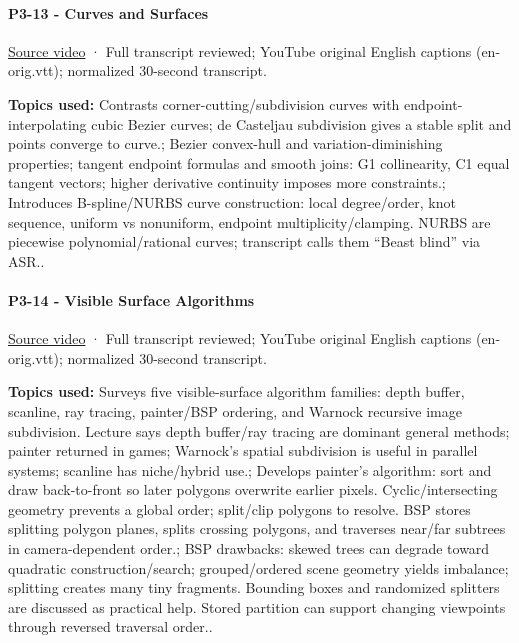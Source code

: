 \paragraph{P3-13 - Curves and Surfaces}\label{p3-13---curves-and-surfaces}

\href{https://www.youtube.com/watch?v=FTg1DUr7bhY}{Source video} · Full transcript reviewed; YouTube original English captions (en-orig.vtt); normalized 30-second transcript.

\textbf{Topics used:} Contrasts corner-cutting/subdivision curves with endpoint-interpolating cubic Bezier curves; de Casteljau subdivision gives a stable split and points converge to curve.; Bezier convex-hull and variation-diminishing properties; tangent endpoint formulas and smooth joins: G1 collinearity, C1 equal tangent vectors; higher derivative continuity imposes more constraints.; Introduces B-spline/NURBS curve construction: local degree/order, knot sequence, uniform vs nonuniform, endpoint multiplicity/clamping. NURBS are piecewise polynomial/rational curves; transcript calls them ``Beast blind'' via ASR..

\paragraph{P3-14 - Visible Surface Algorithms}\label{p3-14---visible-surface-algorithms}

\href{https://www.youtube.com/watch?v=hmlWFi1TdbI}{Source video} · Full transcript reviewed; YouTube original English captions (en-orig.vtt); normalized 30-second transcript.

\textbf{Topics used:} Surveys five visible-surface algorithm families: depth buffer, scanline, ray tracing, painter/BSP ordering, and Warnock recursive image subdivision. Lecture says depth buffer/ray tracing are dominant general methods; painter returned in games; Warnock's spatial subdivision is useful in parallel systems; scanline has niche/hybrid use.; Develops painter's algorithm: sort and draw back-to-front so later polygons overwrite earlier pixels. Cyclic/intersecting geometry prevents a global order; split/clip polygons to resolve. BSP stores splitting polygon planes, splits crossing polygons, and traverses near/far subtrees in camera-dependent order.; BSP drawbacks: skewed trees can degrade toward quadratic construction/search; grouped/ordered scene geometry yields imbalance; splitting creates many tiny fragments. Bounding boxes and randomized splitters are discussed as practical help. Stored partition can support changing viewpoints through reversed traversal order..

